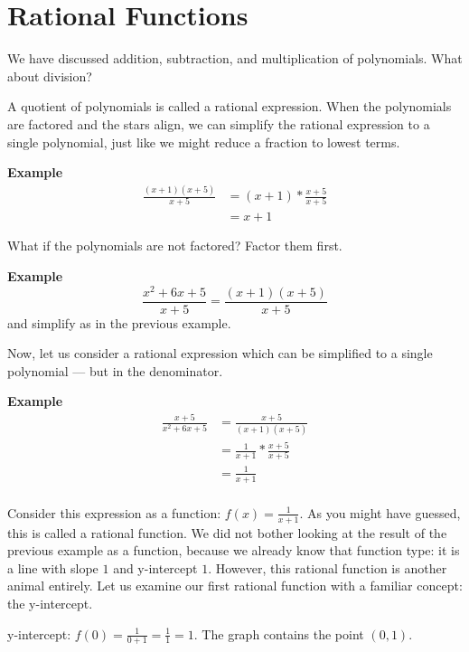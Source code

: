 \chapter{Rational Functions}

We have discussed addition, subtraction, and multiplication of polynomials. What about division?

A quotient of polynomials is called a rational expression. When the polynomials are factored and the stars align, we can simplify the rational expression to a single polynomial, just like we might reduce a fraction to lowest terms.

\textbf{Example} 
\begin{equation} \label{eq1}
\begin{split}
\frac{(x + 1)(x + 5)}{x + 5} & = (x + 1) * \frac{x+5}{x+5} \\
& = x + 1
\end{split}
\end{equation}

What if the polynomials are not factored? Factor them first.

\textbf{Example} 
\[ \frac{x^2 + 6x + 5}{x + 5} = \frac{(x + 1)(x + 5)}{x + 5} \]
and simplify as in the previous example.

Now, let us consider a rational expression which can be simplified to a single polynomial --- but in the denominator.

\textbf{Example}
\begin{equation} \label{eq1}
\begin{split}
\frac{x + 5}{x^2 + 6x + 5} & = \frac{x + 5}{(x + 1)(x + 5)} \\
& = \frac{1}{x+1} * \frac{x+5}{x+5} \\
& = \frac{1}{x+1} \\
\end{split}
\end{equation}

Consider this expression as a function: \( f(x) = \frac{1}{x+1} \). As you might have guessed, this is called a rational function. We did not bother looking at the result of the previous example as a function, because we already know that function type: it is a line with slope \( 1 \) and y-intercept \( 1 \). However, this rational function is another animal entirely. Let us examine our first rational function with a familiar concept: the y-intercept. 

y-intercept: \( f(0) = \frac{1}{0 + 1} = \frac{1}{1} = 1 \). The graph contains the point \( (0, 1) \).

